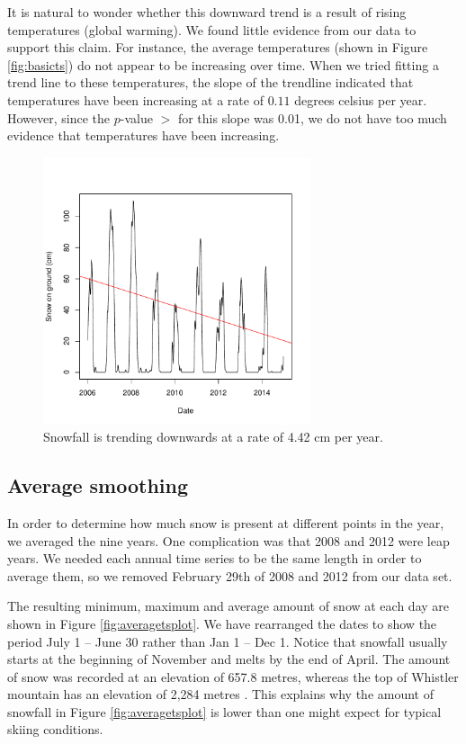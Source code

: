 \documentclass[12pt,twoside]{article}
\begin{document}
{It is natural to wonder whether this downward trend is a result of rising temperatures (global warming). We found little evidence from our data to support this claim. For instance, the average temperatures (shown in Figure \ref{fig:basicts}) do not appear to be increasing  over time. When we tried fitting a trend line to these temperatures, the slope of the trendline indicated that temperatures have been increasing at a rate of $0.11$ degrees celsius per year. However, since the $p$-value $>$ for this slope was 0.01, we do not have too much evidence that temperatures have been increasing.


\begin{figure}[!ht]
\begin{center}
\includegraphics[width=0.7\textwidth]{report-snowtrend}
\end{center}
\vspace{-5mm}
\caption{Snowfall is trending downwards at a rate of 4.42 cm per year.}
\label{fig:snowtrend}
\end{figure}

\subsection{Average smoothing}

In order to determine how much snow is present at different points in the year, we averaged the nine years. One complication was that 2008 and 2012 were leap years. We needed each annual time series to be the same length in order to average them, so we removed February 29th of 2008 and 2012 from our data set.

The resulting minimum, maximum and average amount of snow at each day are shown in Figure \ref{fig:averagetsplot}. We have rearranged the dates to show the period July 1 -- June 30 rather than Jan 1 -- Dec 1. Notice that snowfall usually starts at the beginning of November and melts by the end of April. The amount of snow was recorded at an elevation of 657.8 metres, whereas the top of Whistler mountain has an elevation of 2,284 metres \cite{WhistlerBlackcomb}. This explains why the amount of snowfall in Figure \ref{fig:averagetsplot} is lower than one might expect for typical skiing conditions.

}
\end{document}
